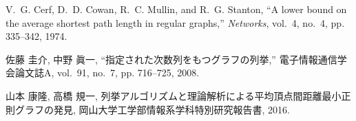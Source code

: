 \begin{thebibliography}{1}
\BIBentryALTinterwordspacing
V.~G. Cerf, D.~D. Cowan, R.~C. Mullin, and R.~G. Stanton, 
``{A lower bound on the average shortest path length in regular
  graphs},'' \emph{Networks}, vol.~4, no.~4, pp. 335--342, 1974.
\BIBentrySTDinterwordspacing

\BIBentryALTinterwordspacing
佐藤 圭介, 中野 眞一, ``指定された次数列をもつグラフの列挙,''
  電子情報通信学会論文誌A, vol.~91, no.~7, pp. 716--725, 2008.
\BIBentrySTDinterwordspacing

山本 康隆, 高橋 規一,
  列挙アルゴリズムと理論解析による平均頂点間距離最小正則グラフの発見,
  岡山大学工学部情報系学科特別研究報告書, 2016.

\end{thebibliography}
